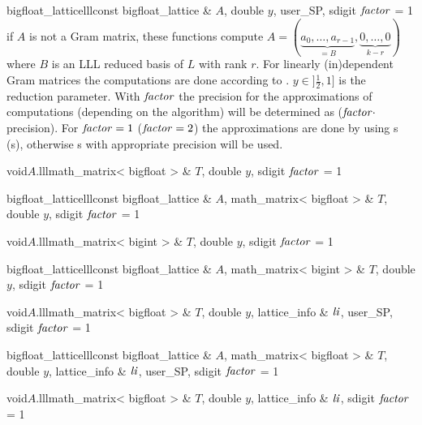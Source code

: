 \begin{fcode}{bigfloat_lattice}{lll}{const bigfloat_lattice & $A$, double $y$, user_SP, sdigit $\mathit{factor}$ = 1}
  if $A$ is not a Gram matrix, these functions compute $A = (\underbrace{a_0, \dots,
    a_{r-1}}_{=B}, \underbrace{0, \dots, 0}_{k-r})$ where $B$ is an LLL reduced basis of $L$
  with rank $r$.  For linearly (in)dependent Gram matrices the computations are done according
  to \cite{Cohen:1995}.  $y\in ]\frac{1}{2},1]$ is the reduction parameter.  With $\mathit{factor}$ the
  precision for the approximations of computations (depending on the algorithm) will be
  determined as ($\mathit{factor} \cdot$  precision).  For $\mathit{factor} = 1$ ($\mathit{factor} = 2$)
  the approximations are done by using s (s), otherwise
  s with appropriate precision will be used.
\end{fcode}

\begin{fcode}{void}{$A$.lll}{math_matrix< bigfloat > & $T$, double $y$, sdigit $\mathit{factor}$ = 1}
\end{fcode}

\begin{fcode}{bigfloat_lattice}{lll}{const bigfloat_lattice & $A$, math_matrix< bigfloat > & $T$,
    double $y$, sdigit $\mathit{factor}$ = 1}%
\end{fcode}

\begin{fcode}{void}{$A$.lll}{math_matrix< bigint > & $T$, double $y$, sdigit $\mathit{factor}$ = 1}
\end{fcode}

\begin{fcode}{bigfloat_lattice}{lll}{const bigfloat_lattice & $A$, math_matrix< bigint > & $T$,
    double $y$, sdigit $\mathit{factor}$ = 1}%
\end{fcode}

\begin{fcode}{void}{$A$.lll}{math_matrix< bigfloat > & $T$, double $y$, lattice_info & $\mathit{li}$,
    user_SP, sdigit $\mathit{factor}$ = 1}%
\end{fcode}

\begin{fcode}{bigfloat_lattice}{lll}{const bigfloat_lattice & $A$,
    math_matrix< bigfloat > & $T$, double $y$, lattice_info & $\mathit{li}$, user_SP, sdigit $\mathit{factor}$ = 1}%
\end{fcode}

\begin{fcode}{void}{$A$.lll}{math_matrix< bigfloat > & $T$, double $y$, lattice_info & $\mathit{li}$,
    sdigit $\mathit{factor}$ = 1}%
\end{fcode}

